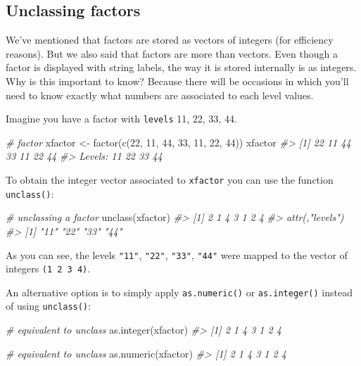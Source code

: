 \documentclass[
]{book}
\newenvironment{Shaded}{\begin{snugshade}}{\end{snugshade}}
\newcommand{\CommentTok}[1]{\textcolor[rgb]{0.56,0.35,0.01}{\textit{#1}}}
\newcommand{\DecValTok}[1]{\textcolor[rgb]{0.00,0.00,0.81}{#1}}
\newcommand{\FunctionTok}[1]{\textcolor[rgb]{0.00,0.00,0.00}{#1}}
\newcommand{\NormalTok}[1]{#1}
\newcommand{\OtherTok}[1]{\textcolor[rgb]{0.56,0.35,0.01}{#1}}
\begin{document}
\hypertarget{unclassing-factors}{%
\subsection{Unclassing factors}\label{unclassing-factors}}

We've mentioned that factors are stored as vectors of integers (for efficiency
reasons). But we also said that factors are more than vectors. Even though a
factor is displayed with string labels, the way it is stored internally is as
integers. Why is this important to know? Because there will be occasions in
which you'll need to know exactly what numbers are associated to each level
values.

Imagine you have a factor with \texttt{levels} 11, 22, 33, 44.

\begin{Shaded}
\begin{Highlighting}[]
\CommentTok{\# factor}
\NormalTok{xfactor }\OtherTok{\textless{}{-}} \FunctionTok{factor}\NormalTok{(}\FunctionTok{c}\NormalTok{(}\DecValTok{22}\NormalTok{, }\DecValTok{11}\NormalTok{, }\DecValTok{44}\NormalTok{, }\DecValTok{33}\NormalTok{, }\DecValTok{11}\NormalTok{, }\DecValTok{22}\NormalTok{, }\DecValTok{44}\NormalTok{))}
\NormalTok{xfactor}
\CommentTok{\#\textgreater{} [1] 22 11 44 33 11 22 44}
\CommentTok{\#\textgreater{} Levels: 11 22 33 44}
\end{Highlighting}
\end{Shaded}

To obtain the integer vector associated to \texttt{xfactor} you can use the function
\texttt{unclass()}:

\begin{Shaded}
\begin{Highlighting}[]
\CommentTok{\# unclassing a factor}
\FunctionTok{unclass}\NormalTok{(xfactor)}
\CommentTok{\#\textgreater{} [1] 2 1 4 3 1 2 4}
\CommentTok{\#\textgreater{} attr(,"levels")}
\CommentTok{\#\textgreater{} [1] "11" "22" "33" "44"}
\end{Highlighting}
\end{Shaded}

As you can see, the levels \texttt{"11"}, \texttt{"22"}, \texttt{"33"}, \texttt{"44"} were mapped to the
vector of integers \texttt{(1\ 2\ 3\ 4)}.

An alternative option is to simply apply \texttt{as.numeric()} or \texttt{as.integer()}
instead of using \texttt{unclass()}:

\begin{Shaded}
\begin{Highlighting}[]
\CommentTok{\# equivalent to unclass}
\FunctionTok{as.integer}\NormalTok{(xfactor)}
\CommentTok{\#\textgreater{} [1] 2 1 4 3 1 2 4}

\CommentTok{\# equivalent to unclass}
\FunctionTok{as.numeric}\NormalTok{(xfactor)}
\CommentTok{\#\textgreater{} [1] 2 1 4 3 1 2 4}
\end{Highlighting}
\end{Shaded}
\end{document}
